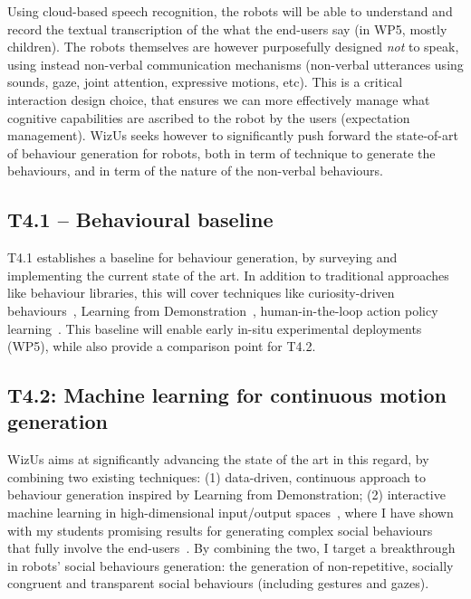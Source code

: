 \documentclass[11pt,a4paper]{report}
\newcommand{\project}{WizUs\xspace}
\begin{document}
Using cloud-based speech recognition, the robots will be able to understand and
record the textual transcription of the what the end-users say (in WP5, mostly
children). The robots themselves are however purposefully designed \emph{not} to
speak, using instead non-verbal communication mechanisms (non-verbal utterances
using sounds, gaze, joint attention, expressive motions, etc). This is a
critical interaction design choice, that ensures we can more effectively manage
what cognitive capabilities are ascribed to the robot by the users (expectation
management).  \project seeks however to significantly push forward the
state-of-art of behaviour generation for robots, both in term of technique to
generate the behaviours, and in term of the nature of the non-verbal behaviours.


\subsection{T4.1 -- Behavioural baseline}

T4.1 establishes a baseline for behaviour
generation, by surveying and implementing the current state of the art. In
addition to traditional approaches like behaviour libraries, this will cover
techniques like curiosity-driven behaviours~\cite{oudeyer2005playground},
Learning from Demonstration~\cite{billard2008robot, argall2009survey},
human-in-the-loop action policy learning~\cite{senft2016sparc,
senft2019teaching}. This baseline will enable early in-situ experimental
deployments (WP5), while also provide a comparison point for T4.2.

\subsection{T4.2: Machine learning for continuous motion generation}

\project aims
at significantly advancing the state of the art in this regard, by combining two
existing techniques: (1) data-driven, continuous approach to behaviour
generation inspired by Learning from Demonstration; (2) interactive machine
learning in high-dimensional input/output spaces~\cite{senft2020woz}, where I
have shown with my students promising results for generating complex social
behaviours~\cite{senft2019teaching, winkle2020coach} that fully involve the
end-users~\cite{winkle2020methodology}.  By combining the two, I target
a breakthrough in robots' social behaviours generation: the generation of
non-repetitive, socially congruent and transparent social behaviours (including
gestures and gazes).
\end{document}

